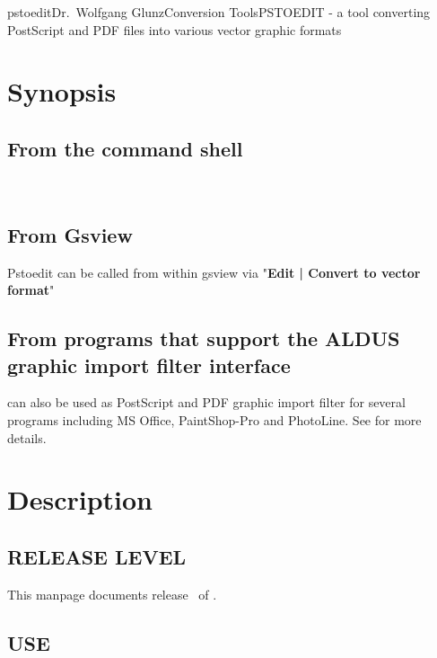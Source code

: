 \documentclass[english,a4paper]{article}
\begin{document}
\begin{Name}{1}{pstoedit}{Dr.\ Wolfgang Glunz}{Conversion Tools}{PSTOEDIT}
   - a tool converting PostScript and PDF files into various
  vector graphic formats
\end{Name}

\section{Synopsis}

\subsection{From the command shell}

 
\\



\subsection{From Gsview}

Pstoedit can be called from within gsview via
"\textbf{Edit | Convert to vector format}"

\subsection{From programs that support the ALDUS graphic import filter interface}

 can also be used as PostScript and PDF graphic import filter for several programs including
MS Office, PaintShop-Pro and PhotoLine. See
 for more
details.


\section{Description}

\subsection{RELEASE LEVEL}

This manpage documents release \Version\ of .

\subsection{USE}
\end{document}
